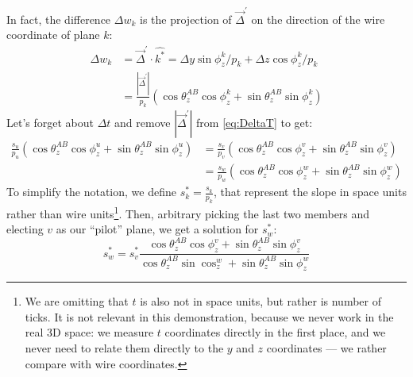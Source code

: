 \documentclass{article}
\newcommand{\MathSym}[1]{\ensuremath{#1}\xspace}
\newcommand{\abs}[1]{\ensuremath{\left|{#1}\right|}}
\DeclareRobustCommand{\brackets}[1]{\ensuremath{\left(#1\right)}}
\newcommand{\thetaDeltaP}{\MathSym{\theta_{z}^{AB}}}
\begin{document}
	In fact, the difference $\Delta w_{k}$ is the projection of $\vec{\Delta}^{\prime}$ on the direction of the wire coordinate of plane $k$:
	\begin{align*}
		\Delta w_{k} &= \vec{\Delta}^{\prime} \cdot \hat{k^{*}} = \Delta y \sin \phi_{z}^{k} / p_{k} + \Delta z \cos \phi_{z}^{k} / p_{k} \nonumber \\
		             &= \frac{\abs{\vec{\Delta}^{\prime}}}{p_{k}} \brackets{\cos \thetaDeltaP \cos \phi_{z}^{k} + \sin \thetaDeltaP \sin \phi_{z}^{k}}
	\end{align*}
	Let's forget about $\Delta t$ and remove \abs{\vec{\Delta}^{\prime}} from \cref{eq:DeltaT} to get:
	\begin{align}
		\frac{s_{u}}{p_{u}} \brackets{\cos \thetaDeltaP \cos \phi_{z}^{u} + \sin \thetaDeltaP \sin \phi_{z}^{u}} 
		  &= \frac{s_{v}}{p_{v}} \brackets{\cos \thetaDeltaP \cos \phi_{z}^{v} + \sin \thetaDeltaP \sin \phi_{z}^{v}} \nonumber \\
		  &= \frac{s_{w}}{p_{w}} \brackets{\cos \thetaDeltaP \cos \phi_{z}^{w} + \sin \thetaDeltaP \sin \phi_{z}^{w}}
		\label{eq:T}
	\end{align}
	To simplify the notation, we define $s^{*}_{k} = \frac{s_{k}}{p_{k}}$, that represent the slope in space units rather than wire units\footnote{
		We are omitting that $t$ is also not in space units, but rather is number of ticks.
		It is not relevant in this demonstration, because we never work in the real 3D space: we measure $t$ coordinates directly in the first place, and we never need to relate them directly to the $y$ and $z$ coordinates --- we rather compare with wire coordinates.
	}.
	Then, arbitrary picking the last two members and electing $v$ as our ``pilot'' plane, we get a solution for $s^{*}_{w}$:
	\begin{equation}
		\label{eq:sw_general}
		s^{*}_{w} = s^{*}_{v} \frac{\cos \thetaDeltaP \cos \phi_{z}^{v} + \sin \thetaDeltaP \sin \phi_{z}^{v}}{\cos \thetaDeltaP \sin \cos_{z}^{w} + \sin \thetaDeltaP \sin \phi_{z}^{w}}
	\end{equation}
	
\end{document}
